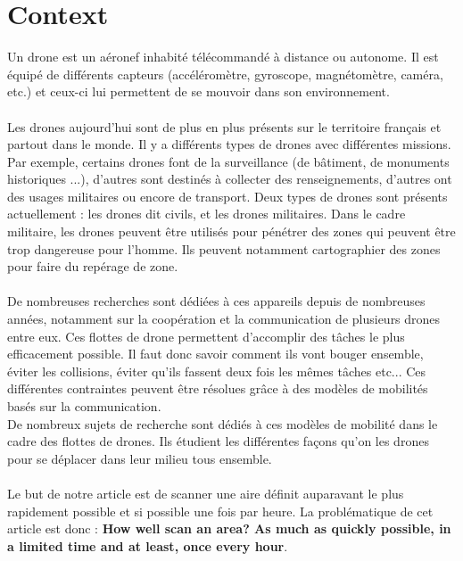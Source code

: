 \chapter{Context}


Un drone est un aéronef inhabité télécommandé à distance ou autonome. Il est équipé de différents capteurs (accéléromètre, gyroscope, magnétomètre, caméra, etc.) et ceux-ci lui permettent de se mouvoir dans son environnement. \\\\

Les drones aujourd'hui sont de plus en plus présents sur le territoire français et partout dans le monde. Il y a différents types de drones avec différentes missions. Par exemple, certains drones font de la surveillance (de bâtiment, de monuments historiques ...), d'autres sont destinés à collecter des renseignements, d'autres ont des usages militaires ou encore de transport. Deux types de drones sont présents actuellement : les drones dit civils, et les drones militaires. Dans le cadre militaire, les drones peuvent être utilisés pour pénétrer des zones qui peuvent être trop dangereuse pour l'homme. Ils peuvent notamment cartographier des zones pour faire du repérage de zone.\\\\


  De nombreuses recherches sont dédiées à ces appareils depuis de nombreuses années, notamment sur la coopération et la communication de plusieurs drones entre eux. Ces flottes de drone permettent d'accomplir des tâches le plus efficacement possible. Il faut donc savoir comment ils vont bouger ensemble, éviter les collisions, éviter qu'ils fassent deux fois les mêmes tâches etc... Ces différentes contraintes peuvent être résolues grâce à des modèles de mobilités basés sur la communication.\\
  De nombreux sujets de recherche sont dédiés à ces modèles de mobilité dans le cadre des flottes de drones. Ils étudient les différentes façons qu'on les drones pour se déplacer dans leur milieu tous ensemble.\\\\
  
Le but de notre article est de scanner une aire définit auparavant le plus rapidement possible et si possible une fois par heure. La problématique de cet article est donc :
\textbf{How well scan an area? As much as quickly possible, in a limited time and at least, once every hour}.\\\\

